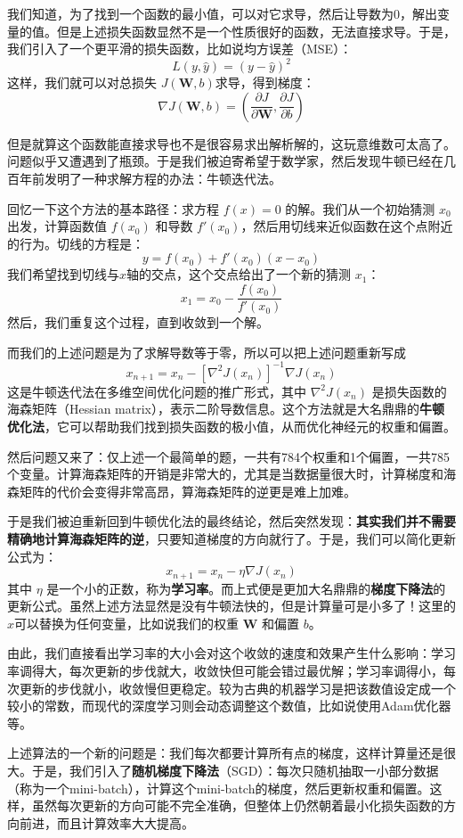 我们知道，为了找到一个函数的最小值，可以对它求导，然后让导数为0，解出变量的值。但是上述损失函数显然不是一个性质很好的函数，无法直接求导。于是，我们引入了一个更平滑的损失函数，比如说均方误差（MSE）：
\[ L(y, \hat{y}) = (y - \hat{y})^2 \]
这样，我们就可以对总损失 $J(\mathbf{W}, b)$求导，得到梯度：
\[ \nabla J(\mathbf{W}, b) = \left( \frac{\partial J}{\partial \mathbf{W}}, \frac{\partial J}{\partial b} \right) \]

但是就算这个函数能直接求导也不是很容易求出解析解的，这玩意维数可太高了。问题似乎又遭遇到了瓶颈。于是我们被迫寄希望于数学家，然后发现牛顿已经在几百年前发明了一种求解方程的办法：牛顿迭代法。

回忆一下这个方法的基本路径：求方程 $f(x) = 0$ 的解。我们从一个初始猜测 $x_0$ 出发，计算函数值 $f(x_0)$ 和导数 $f'(x_0)$，然后用切线来近似函数在这个点附近的行为。切线的方程是：
\[ y = f(x_0) + f'(x_0)(x - x_0) \]
我们希望找到切线与$x$轴的交点，这个交点给出了一个新的猜测 $x_1$：
\[ x_1 = x_0 - \frac{f(x_0)}{f'(x_0)} \]
然后，我们重复这个过程，直到收敛到一个解。

而我们的上述问题是为了求解导数等于零，所以可以把上述问题重新写成
\[ x_{n+1} = x_n - [\nabla^2 J(x_n)]^{-1} \nabla J(x_n) \]
这是牛顿迭代法在多维空间优化问题的推广形式，其中 $\nabla^2 J(x_n)$ 是损失函数的海森矩阵（Hessian matrix），表示二阶导数信息。这个方法就是大名鼎鼎的\textbf{牛顿优化法}，它可以帮助我们找到损失函数的极小值，从而优化神经元的权重和偏置。

然后问题又来了：仅上述一个最简单的题，一共有784个权重和1个偏置，一共785个变量。计算海森矩阵的开销是非常大的，尤其是当数据量很大时，计算梯度和海森矩阵的代价会变得非常高昂，算海森矩阵的逆更是难上加难。

于是我们被迫重新回到牛顿优化法的最终结论，然后突然发现：\textbf{其实我们并不需要精确地计算海森矩阵的逆}，只要知道梯度的方向就行了。于是，我们可以简化更新公式为：
\[ x_{n+1} = x_n - \eta \nabla J(x_n) \]
其中 $\eta$ 是一个小的正数，称为\textbf{学习率}。而上式便是更加大名鼎鼎的\textbf{梯度下降法}的更新公式。虽然上述方法显然是没有牛顿法快的，但是计算量可是小多了！这里的$x$可以替换为任何变量，比如说我们的权重 $\mathbf{W}$ 和偏置 $b$。

由此，我们直接看出学习率的大小会对这个收敛的速度和效果产生什么影响：学习率调得大，每次更新的步伐就大，收敛快但可能会错过最优解；学习率调得小，每次更新的步伐就小，收敛慢但更稳定。较为古典的机器学习是把该数值设定成一个较小的常数，而现代的深度学习则会动态调整这个数值，比如说使用Adam优化器等。

上述算法的一个新的问题是：我们每次都要计算所有点的梯度，这样计算量还是很大。于是，我们引入了\textbf{随机梯度下降法}（SGD）：每次只随机抽取一小部分数据（称为一个mini-batch），计算这个mini-batch的梯度，然后更新权重和偏置。这样，虽然每次更新的方向可能不完全准确，但整体上仍然朝着最小化损失函数的方向前进，而且计算效率大大提高。

